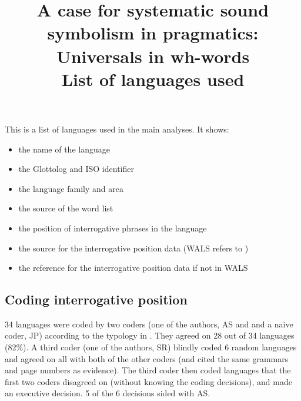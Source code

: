 \documentclass[8pt,landscape,a4paper]{article}
\title{A case for systematic sound symbolism in pragmatics: Universals in wh-words \\ List of languages used}
\author{}
\date{} %
\begin{document}
\maketitle

This is a list of languages used in the main analyses.  It shows:
\begin{itemize}
\item the name of the language
\item the Glottolog and ISO identifier
\item the language family and area
\item the source of the word list
\item the position of interrogative phrases in the language
\item the source for the interrogative position data (WALS refers to \cite{wals-93})
\item the reference for the interrogative position data if not in WALS
\end{itemize}

\subsection*{Coding interrogative position}
34 languages were coded by two coders (one of the authors, AS and and a naive coder, JP) according to the typology in \cite{wals-93}.  They agreed on 28 out of 34 languages (82\%).  A third coder (one of the authors, SR) blindly coded 6 random languages and agreed on all with both of the other coders (and cited the same grammars and page numbers as evidence).  The third coder then coded languages that the first two coders disagreed on (without knowing the coding decisions), and made an executive decision.  5 of the 6 decisions sided with AS. 

\clearpage
\newpage

{\scriptsize

}

\clearpage
\newpage



\end{document}
